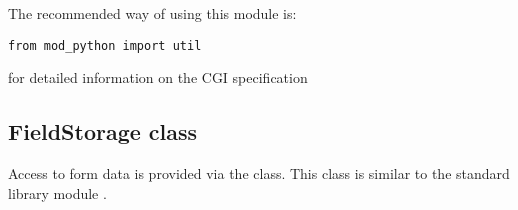 The recommended way of using this module is:
\begin{verbatim}
from mod_python import util
\end{verbatim}

\begin{seealso}
           {for detailed information on the CGI specification}
\end{seealso}

\subsection{FieldStorage class\label{pyapi-util-fstor}}

Access to form data is provided via the 
class. This class is similar to the standard library module
 .

